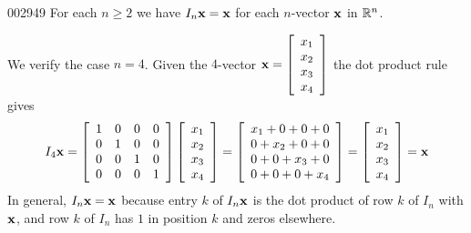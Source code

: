 \begin{example}{}{002949}
For each $n \geq 2$ we have $I_{n}\textbf{x} = \textbf{x}$ for each $n$-vector $\textbf{x}$ in $\mathbb{R}^n$.


\begin{solution}
  We verify the case $n = 4$. Given the $4$-vector $\textbf{x} = \left[ \begin{array}{c}
  x_{1} \\
  x_{2} \\
  x_{3} \\
  x_{4}
  \end{array} \right]$
 the dot product rule gives
\begin{equation*}
I_{4}\textbf{x} = \left[ \begin{array}{rrrr}
1 & 0 & 0 & 0 \\
0 & 1 & 0 & 0 \\
0 & 0 & 1 & 0 \\
0 & 0 & 0 & 1
\end{array} \right] \left[ \begin{array}{c}
x_{1} \\
x_{2} \\
x_{3} \\
x_{4}
\end{array} \right] = \left[ \begin{array}{c}
x_{1} + 0 + 0 + 0 \\
0 + x_{2} + 0 + 0 \\
0 + 0 + x_{3} + 0 \\
0 + 0 + 0 + x_{4}
\end{array} \right] = \left[ \begin{array}{c}
x_{1} \\
x_{2} \\
x_{3} \\
x_{4}
\end{array} \right] = \textbf{x}
\end{equation*}
In general, $I_{n}\textbf{x} = \textbf{x}$ because entry $k$ of $I_{n}\textbf{x}$ is the dot product of row $k$ of $I_{n}$ with $\textbf{x}$, and row $k$ of $I_{n}$ has $1$ in position $k$ and zeros elsewhere.
\end{solution}
\end{example}

